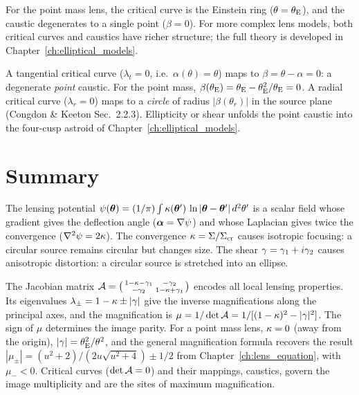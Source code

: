 For the point mass lens, the critical curve is the Einstein ring
($\theta = \theta_{\mathrm{E}}$), and the caustic degenerates to a single point
($\beta = 0$).  For more complex lens models, both critical curves
and caustics have richer structure; the full theory is developed
in Chapter~\ref{ch:elliptical_models}.
\begin{annotation}
A tangential critical curve ($\lambda_t = 0$, i.e.\ $\alpha(\theta) = \theta$)
maps to $\beta = \theta - \alpha = 0$: a degenerate \emph{point} caustic. For the
point mass, $\beta(\theta_{\mathrm{E}}) = \theta_{\mathrm{E}} - \theta_{\mathrm{E}}^2/\theta_{\mathrm{E}} = 0$. A radial
critical curve ($\lambda_r = 0$) maps to a \emph{circle} of radius
$|\beta(\theta_r)|$ in the source plane (Congdon \& Keeton Sec.~2.2.3).
Ellipticity or shear unfolds the point caustic into the four-cusp astroid of
Chapter~\ref{ch:elliptical_models}.
\end{annotation}


\section{Summary}
\label{sec:mag_summary}

The lensing potential
$\psi(\boldsymbol{\theta}) = (1/\pi)\int\kappa(\boldsymbol{\theta}')\,
\ln|\boldsymbol{\theta} - \boldsymbol{\theta}'|\,d^2\theta'$ is a scalar
field whose gradient gives the deflection angle
($\boldsymbol{\alpha} = \nabla\psi$) and whose Laplacian gives
twice the convergence ($\nabla^2\psi = 2\kappa$).  The convergence
$\kappa = \Sigma/\Sigma_{\mathrm{cr}}$ causes isotropic focusing: a circular source
remains circular but changes size.  The shear $\gamma = \gamma_1 + i\gamma_2$
causes anisotropic distortion: a circular source is stretched into an
ellipse.

The Jacobian matrix
$\mathcal{A} = \bigl(\begin{smallmatrix}
1-\kappa-\gamma_1 & -\gamma_2 \\
-\gamma_2 & 1-\kappa+\gamma_1
\end{smallmatrix}\bigr)$
encodes all local lensing properties.  Its eigenvalues
$\lambda_\pm = 1 - \kappa \pm |\gamma|$ give the inverse magnifications
along the principal axes, and the magnification is
$\mu = 1/\det\mathcal{A} = 1/[(1-\kappa)^2 - |\gamma|^2]$.  The sign of
$\mu$ determines the image parity.  For a point mass lens, $\kappa = 0$
(away from the origin), $|\gamma| = \theta_{\mathrm{E}}^2/\theta^2$, and the
general magnification formula recovers the result
$|\mu_\pm| = (u^2+2)/(2u\sqrt{u^2+4}) \pm 1/2$ from Chapter~\ref{ch:lens_equation},
with $\mu_- < 0$.  Critical curves ($\det\mathcal{A} = 0$) and their mappings,
caustics, govern the image multiplicity and are the sites of maximum
magnification.


